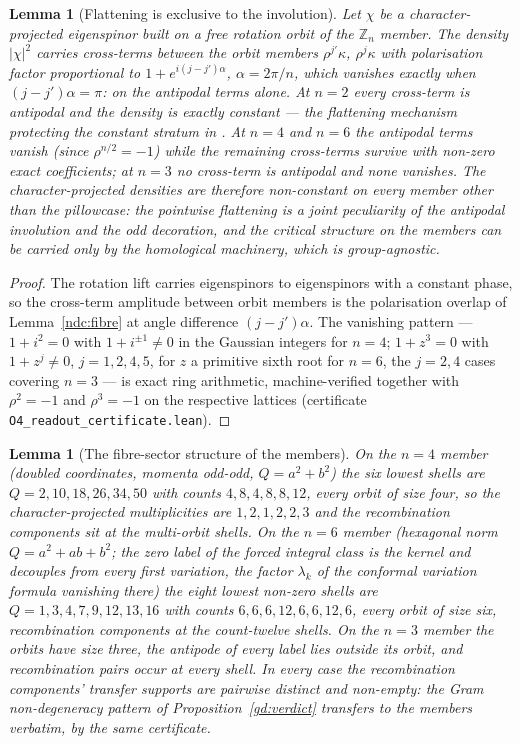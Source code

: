 \documentclass[11pt]{article}
\numberwithin{equation}{section}
\theoremstyle{plain}
\newtheorem{lemma}[theorem]{Lemma}
\theoremstyle{definition}
\theoremstyle{remark}
\newcommand{\Zn}[1][n]{\mathbb{Z}_{#1}}
\begin{document}
\begin{lemma}[Flattening is exclusive to the
involution]\label{o4r:flat}
Let $\chi$ be a character-projected eigenspinor built on a free
rotation orbit of the $\Zn$ member. The density $|\chi|^{2}$
carries cross-terms between the orbit members $\rho^{j'}\kappa$,
$\rho^{j}\kappa$ with polarisation factor proportional to
$1 + e^{i(j - j')\alpha}$, $\alpha = 2\pi/n$, which vanishes
exactly when $(j - j')\alpha = \pi$: on the antipodal terms
alone. At $n = 2$ every cross-term is antipodal and the density is
exactly constant --- the flattening mechanism protecting the
constant stratum in \cite{MEF3}. At $n = 4$ and $n = 6$ the
antipodal terms vanish (since $\rho^{n/2} = -1$) while the
remaining cross-terms survive with non-zero exact coefficients; at
$n = 3$ no cross-term is antipodal and none vanishes. The
character-projected densities are therefore non-constant on every
member other than the pillowcase: the pointwise flattening is a
joint peculiarity of the antipodal involution and the odd
decoration, and the critical structure on the members can be
carried only by the homological machinery, which is
group-agnostic.
\end{lemma}

\begin{proof}
The rotation lift carries eigenspinors to eigenspinors with a
constant phase, so the cross-term amplitude between orbit members
is the polarisation overlap of Lemma~\ref{ndc:fibre} at angle
difference $(j - j')\alpha$. The vanishing pattern ---
$1 + i^{2} = 0$ with $1 + i^{\pm 1} \neq 0$ in the Gaussian
integers for $n = 4$; $1 + z^{3} = 0$ with $1 + z^{j} \neq 0$,
$j = 1, 2, 4, 5$, for $z$ a primitive sixth root for $n = 6$, the
$j = 2, 4$ cases covering $n = 3$ --- is exact ring arithmetic,
machine-verified together with $\rho^{2} = -1$ and
$\rho^{3} = -1$ on the respective lattices (certificate
\texttt{O4\_readout\_certificate.lean}).
\end{proof}

\begin{lemma}[The fibre-sector structure of the
members]\label{o4r:structure}
On the $n = 4$ member (doubled coordinates, momenta odd-odd,
$Q = a^{2} + b^{2}$) the six lowest shells are
$Q = 2, 10, 18, 26, 34, 50$ with counts $4, 8, 4, 8, 8, 12$, every
orbit of size four, so the character-projected multiplicities are
$1, 2, 1, 2, 2, 3$ and the recombination components sit at the
multi-orbit shells. On the $n = 6$ member (hexagonal norm
$Q = a^{2} + ab + b^{2}$; the zero label of the forced integral
class is the kernel and decouples from every first variation, the
factor $\lambda_{k}$ of the conformal variation formula vanishing
there) the eight lowest non-zero shells are
$Q = 1, 3, 4, 7, 9, 12, 13, 16$ with counts
$6, 6, 6, 12, 6, 6, 12, 6$, every orbit of size six, recombination
components at the count-twelve shells. On the $n = 3$ member the
orbits have size three, the antipode of every label lies outside
its orbit, and recombination pairs occur at every shell. In every
case the recombination components' transfer supports are pairwise
distinct and non-empty: the Gram non-degeneracy pattern of
Proposition~\ref{gd:verdict} transfers to the members verbatim,
by the same certificate.
\end{lemma}
\end{document}
